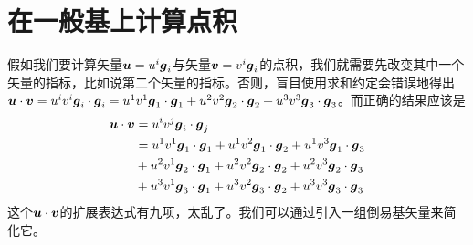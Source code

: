 \section{在一般基上计算点积}
假如我们要计算矢量$\boldsymbol{u}=u^i\boldsymbol{g}_i$与矢量$\boldsymbol{v}=v^i\boldsymbol{g}_i$的点积，我们就需要先改变其中一个矢量的指标，比如说第二个矢量的指标。否则，盲目使用求和约定会错误地得出$\boldsymbol{u}\cdot \boldsymbol{v}=u^iv^i\boldsymbol{g}_i\cdot \boldsymbol{g}_i=u^1v^1\boldsymbol{g}_1\cdot \boldsymbol{g}_1+u^2v^2\boldsymbol{g}_2\cdot \boldsymbol{g}_2+u^3v^3\boldsymbol{g}_3\cdot \boldsymbol{g}_3$。而正确的结果应该是
\begin{align}
	\boldsymbol{u}\cdot \boldsymbol{v}&=u^iv^j\boldsymbol{g}_i\cdot \boldsymbol{g}_j\nonumber\\
	&=u^1v^1\boldsymbol{g}_1\cdot \boldsymbol{g}_1+u^1v^2\boldsymbol{g}_1\cdot \boldsymbol{g}_2+u^1v^3\boldsymbol{g}_1\cdot \boldsymbol{g}_3\nonumber\\
	&+u^2v^1\boldsymbol{g}_2\cdot \boldsymbol{g}_1+u^2v^2\boldsymbol{g}_2\cdot \boldsymbol{g}_2+u^2v^3\boldsymbol{g}_2\cdot \boldsymbol{g}_3\nonumber\\
	&+u^3v^1\boldsymbol{g}_3\cdot \boldsymbol{g}_1+u^3v^2\boldsymbol{g}_3\cdot \boldsymbol{g}_2+u^3v^3\boldsymbol{g}_3\cdot \boldsymbol{g}_3\label{equ:2.3}
\end{align}
这个$\boldsymbol{u}\cdot \boldsymbol{v}$的扩展表达式有九项，太乱了。我们可以通过引入一组倒易基矢量来简化它。